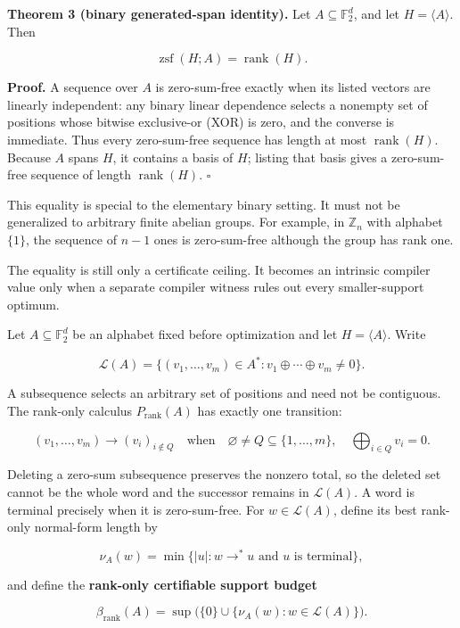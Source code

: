 \documentclass[11pt]{article}
\begin{document}
\textbf{Theorem 3 (binary generated-span identity).} Let \(A\subseteq \mathbb{F}_2^d\), and let \(H=\langle A\rangle\). Then

\[
\operatorname{zsf}(H;A)=\operatorname{rank}(H).
\]

\textbf{Proof.} A sequence over \(A\) is zero-sum-free exactly when its listed vectors are linearly independent: any binary linear dependence selects a nonempty set of positions whose bitwise exclusive-or (XOR) is zero, and the converse is immediate. Thus every zero-sum-free sequence has length at most \(\operatorname{rank}(H)\). Because \(A\) spans \(H\), it contains a basis of \(H\); listing that basis gives a zero-sum-free sequence of length \(\operatorname{rank}(H)\). \(\square\)

This equality is special to the elementary binary setting. It must not be generalized to arbitrary finite abelian groups. For example, in \(\mathbb{Z}_n\) with alphabet \(\{1\}\), the sequence of \(n-1\) ones is zero-sum-free although the group has rank one.

The equality is still only a certificate ceiling. It becomes an intrinsic compiler value only when a separate compiler witness rules out every smaller-support optimum.

Let \(A\subseteq\mathbb{F}_2^d\) be an alphabet fixed before optimization and let \(H=\langle A\rangle\). Write

\[
\mathcal{L}(A)=\{(v_1,\ldots,v_m)\in A^*:v_1\oplus\cdots\oplus v_m\neq 0\}.
\]

A subsequence selects an arbitrary set of positions and need not be contiguous. The rank-only calculus \(P_{\mathrm{rank}}(A)\) has exactly one transition:

\[
(v_1,\ldots,v_m)
\longrightarrow
(v_i)_{i\notin Q}
\quad\text{when}\quad
\varnothing\neq Q\subseteq\{1,\ldots,m\},
\quad
\bigoplus_{i\in Q}v_i=0.
\]

Deleting a zero-sum subsequence preserves the nonzero total, so the deleted set cannot be the whole word and the successor remains in \(\mathcal{L}(A)\). A word is terminal precisely when it is zero-sum-free. For \(w\in\mathcal{L}(A)\), define its best rank-only normal-form length by

\[
\nu_A(w)=
\min\{|u|:w\longrightarrow^*u\text{ and }u\text{ is terminal}\},
\]

and define the \textbf{rank-only certifiable support budget}

\[
\beta_{\mathrm{rank}}(A)
=
\sup\bigl(\{0\}\cup\{\nu_A(w):w\in\mathcal{L}(A)\}\bigr).
\]
\end{document}

